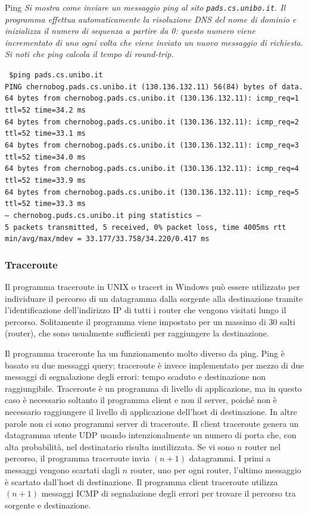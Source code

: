 \begin{Example}{Ping}{}
    \textit{Si mostra come inviare un messaggio ping al sito \texttt{pads.cs.unibo.it}. Il programma effettua automaticamente la risoluzione DNS del nome di dominio e inizializza il numero di sequenza a partire da 0: questo numero viene incrementato di uno ogni volta che viene inviato un nuovo messaggio di richiesta. Si noti che ping calcola il tempo di round-trip.}
    
    \texttt{
    \$ping pads.cs.unibo.it\\
    PING chernobog.pads.cs.unibo.it (130.136.132.11) 56(84) bytes of data.\\
    64 bytes from chernobog.pads.cs.unibo.it (130.136.132.11): icmp\_req=1 ttl=52 time=34.2 ms\\
    64 bytes from chernobog.pads.cs.unibo.it (130.136.132.11): icmp\_req=2 ttl=52 time=33.1 ms\\
    64 bytes from chernobog.pads.cs.unibo.it (130.136.132.11): icmp\_req=3 ttl=52 time=34.0 ms\\
    64 bytes from chernobog.pads.cs.unibo.it (130.136.132.11): icmp\_req=4 ttl=52 time=33.9 ms\\
    64 bytes from chernobog.pads.cs.unibo.it (130.136.132.11): icmp\_req=5 ttl=52 time=33.3 ms\\
    --- chernobog.puds.cs.unibo.it ping statistics ---\\
    5 packets transmitted, 5 received, 0\% packet loss, time 4005ms rtt min/avg/max/mdev = 33.177/33.758/34.220/0.417 ms
    }
\end{Example}

\subsubsection{Traceroute}
Il programma traceroute in UNIX o tracert in Windows può essere utilizzato per individuare il percorso di un datagramma dalla sorgente alla destinazione tramite l'identificazione dell'indirizzo IP di tutti i router che vengono visitati lungo il percorso. Solitamente il programma viene impostato per un massimo di 30 salti (router), che sono usualmente sufficienti per raggiungere la destinazione.

Il programma traceroute ha un funzionamento molto diverso da ping. Ping è basato su due messaggi query; traceroute è invece implementato per mezzo di due messaggi di segnalazione degli errori: tempo scaduto e destinazione non raggiungibile. Traceroute è un programma di livello di applicazione, ma in questo caso è necessario soltanto il programma client e non il server, poiché non è necessario raggiungere il livello di applicazione dell'host di destinazione. In altre parole non ci sono programmi server di traceroute. Il client traceroute genera un datagramma utente UDP usando intenzionalmente un numero di porta che, con alta probabilità, nel destinatario risulta inutilizzata. Se vi sono $n$ router nel percorso, il programma traceroute invia $(n + 1)$ datagrammi. I primi a messaggi vengono scartati dagli $n$ router, uno per ogni router, l'ultimo messaggio è scartato dall'host di destinazione. Il programma client traceroute utilizza $(n+1)$ messaggi ICMP di segnalazione degli errori per trovare il percorso tra sorgente e destinazione. 



